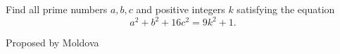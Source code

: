 Find all prime numbers $a,b,c$ and positive integers $k$ satisfying the equation \[a^2+b^2+16c^2 = 9k^2 + 1.\]

Proposed by Moldova